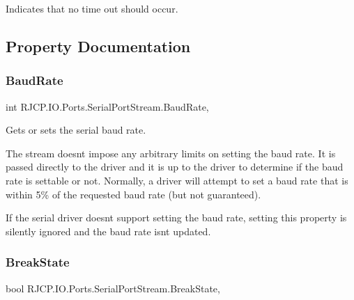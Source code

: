 Indicates that no time out should occur. 



\subsection{Property Documentation}
\mbox{\label{class_r_j_c_p_1_1_i_o_1_1_ports_1_1_serial_port_stream_acb3fb6aa83ebc6d2c23400df6353efca}} 
\subsubsection{\texorpdfstring{BaudRate}{BaudRate}}
{\footnotesize\ttfamily int R\+J\+C\+P.\+I\+O.\+Ports.\+Serial\+Port\+Stream.\+Baud\+Rate\hspace{0.3cm}{\ttfamily [get]}, {\ttfamily [set]}}



Gets or sets the serial baud rate. 

The stream doesn\textquotesingle{}t impose any arbitrary limits on setting the baud rate. It is passed directly to the driver and it is up to the driver to determine if the baud rate is settable or not. Normally, a driver will attempt to set a baud rate that is within 5\% of the requested baud rate (but not guaranteed). 

If the serial driver doesn\textquotesingle{}t support setting the baud rate, setting this property is silently ignored and the baud rate isn\textquotesingle{}t updated.\mbox{\label{class_r_j_c_p_1_1_i_o_1_1_ports_1_1_serial_port_stream_aa68ecd352b374f4f0494a4aa22a750fe}} 
\subsubsection{\texorpdfstring{BreakState}{BreakState}}
{\footnotesize\ttfamily bool R\+J\+C\+P.\+I\+O.\+Ports.\+Serial\+Port\+Stream.\+Break\+State\hspace{0.3cm}{\ttfamily [get]}, {\ttfamily [set]}}



